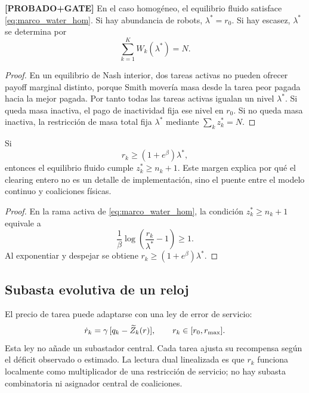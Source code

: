 \begin{teorema} \textbf{[PROBADO+GATE]}
En el caso homogéneo, el equilibrio fluido satisface \eqref{eq:marco_water_hom}. Si hay
abundancia de robots, $\lambda^*=r_0$. Si hay escasez, $\lambda^*$ se determina por
\[
  \sum_{k=1}^{K}W_k(\lambda^*)=N.
\]
\end{teorema}

\begin{proof}
En un equilibrio de Nash interior, dos tareas activas no pueden ofrecer payoff marginal
distinto, porque Smith movería masa desde la tarea peor pagada hacia la mejor pagada.
Por tanto todas las tareas activas igualan un nivel $\lambda^*$. Si queda masa inactiva,
el pago de inactividad fija ese nivel en $r_0$. Si no queda masa inactiva, la restricción
de masa total fija $\lambda^*$ mediante $\sum_k z_k^*=N$.
\end{proof}

\begin{corolario}
Si
\[
  r_k\ge (1+e^\beta)\lambda^*,
\]
entonces el equilibrio fluido cumple $z_k^*\ge n_k+1$. Este margen explica por qué el
clearing entero no es un detalle de implementación, sino el puente entre el modelo
continuo y coaliciones físicas.
\end{corolario}

\begin{proof}
En la rama activa de \eqref{eq:marco_water_hom}, la condición
$z_k^*\ge n_k+1$ equivale a
\[
  \frac{1}{\beta}\log\left(\frac{r_k}{\lambda^*}-1\right)\ge1.
\]
Al exponentiar y despejar se obtiene $r_k\ge(1+e^\beta)\lambda^*$.
\end{proof}

\subsection{Subasta evolutiva de un reloj}

El precio de tarea puede adaptarse con una ley de error de servicio:
\begin{equation}
  \dot r_k=\gamma\,[q_k-\widetilde{Z}_k(r)],
  \qquad r_k\in[r_0,r_{\max}].
  \label{eq:marco_subasta}
\end{equation}
Esta ley no añade un subastador central. Cada tarea ajusta su recompensa según el déficit
observado o estimado. La lectura dual linealizada es que $r_k$ funciona localmente como
multiplicador de una restricción de servicio; no hay subasta combinatoria ni asignador
central de coaliciones.

